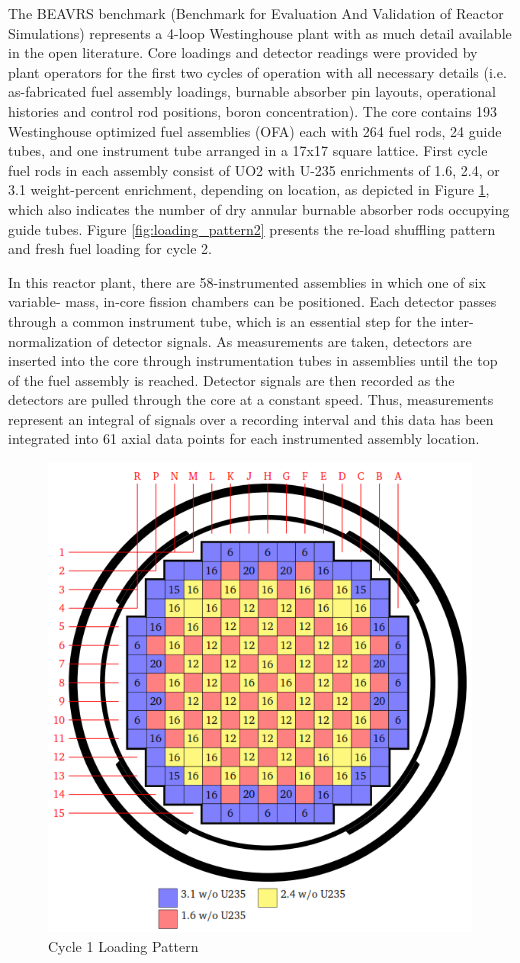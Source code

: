 \documentclass{article}
\begin{document}
The BEAVRS benchmark (Benchmark for Evaluation And Validation of Reactor Simulations) represents a 4-loop Westinghouse plant with as much detail available in the open literature.  Core loadings and detector readings were provided by plant operators for the first two cycles of operation with all necessary details (i.e. as-fabricated fuel assembly loadings, burnable absorber pin layouts, operational histories and control rod positions, boron concentration).  The core contains 193 Westinghouse optimized fuel assemblies (OFA) each with 264 fuel rods, 24 guide tubes, and one instrument tube arranged in a 17x17 square lattice. First cycle fuel rods in each assembly consist of UO2 with U-235 enrichments of 1.6, 2.4, or 3.1 weight-percent enrichment, depending on location, as depicted in Figure \ref{fig:loading_pattern1}, which also indicates the number of dry annular burnable absorber rods occupying guide tubes.  Figure \ref{fig:loading_pattern2} presents the re-load shuffling pattern and fresh fuel loading for cycle 2. 

In this reactor plant, there are 58-instrumented assemblies in which one of six variable- mass, in-core fission chambers can be positioned.  Each detector passes through a common instrument tube, which is an essential step for the inter-normalization of detector signals. As measurements are taken, detectors are inserted into the core through instrumentation tubes in assemblies until the top of the fuel assembly is reached. Detector signals are then recorded as the detectors are pulled through the core at a constant speed. Thus, measurements represent an integral of signals over a recording interval and this data has been integrated into 61 axial data points for each instrumented assembly location. 

\begin{figure}[!htb]
\centering
\includegraphics[width = 4.5 in]{figures/loading_pattern.png}
\caption{Cycle 1 Loading Pattern}
\label{fig:loading_pattern1}
\end{figure}
\end{document}
